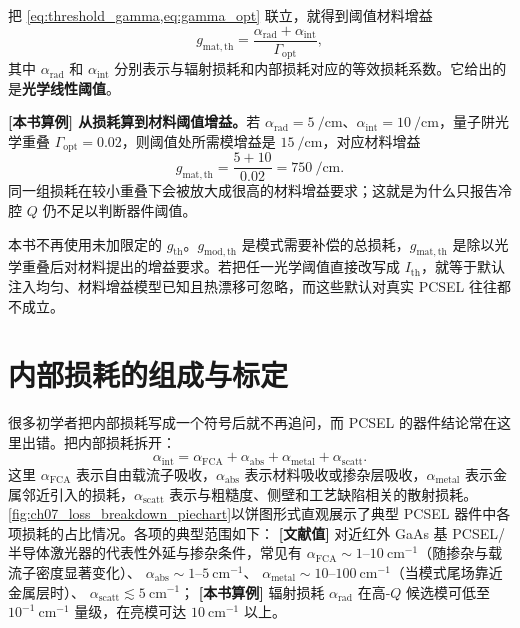 把 \cref{eq:threshold_gamma,eq:gamma_opt} 联立，就得到阈值材料增益
\begin{equation}
 g_{\mathrm{mat,th}} = \frac{\alpha_{\mathrm{rad}}+\alpha_{\mathrm{int}}}{\Gamma_{\mathrm{opt}}},
\label{eq:gth}
\end{equation}
其中 $\alpha_{\mathrm{rad}}$ 和 $\alpha_{\mathrm{int}}$ 分别表示与辐射损耗和内部损耗对应的等效损耗系数。它给出的是\textbf{光学线性阈值}。

\begin{ExampleBox}
\textbf{[本书算例] 从损耗算到材料阈值增益。}若 $\alpha_{\mathrm{rad}}=\SI{5}{\per\centi\meter}$、$\alpha_{\mathrm{int}}=\SI{10}{\per\centi\meter}$，量子阱光学重叠 $\Gamma_{\mathrm{opt}}=0.02$，则阈值处所需模增益是 $\SI{15}{\per\centi\meter}$，对应材料增益
\[
g_{\mathrm{mat,th}}=\frac{5+10}{0.02}=\SI{750}{\per\centi\meter}.
\]
同一组损耗在较小重叠下会被放大成很高的材料增益要求；这就是为什么只报告冷腔 $Q$ 仍不足以判断器件阈值。
\end{ExampleBox}

本书不再使用未加限定的 $g_{\mathrm{th}}$。$g_{\mathrm{mod,th}}$ 是模式需要补偿的总损耗，$g_{\mathrm{mat,th}}$ 是除以光学重叠后对材料提出的增益要求。若把任一光学阈值直接改写成 $I_{\mathrm{th}}$，就等于默认注入均匀、材料增益模型已知且热漂移可忽略，而这些默认对真实 PCSEL 往往都不成立。

\section{内部损耗的组成与标定}
很多初学者把内部损耗写成一个符号后就不再追问，而 PCSEL 的器件结论常在这里出错。把内部损耗拆开：
\begin{equation}
\alpha_{\mathrm{int}} = \alpha_{\mathrm{FCA}} + \alpha_{\mathrm{abs}} + \alpha_{\mathrm{metal}} + \alpha_{\mathrm{scatt}}.
\label{eq:alpha_int_detail}
\end{equation}
这里 $\alpha_{\mathrm{FCA}}$ 表示自由载流子吸收，$\alpha_{\mathrm{abs}}$ 表示材料吸收或掺杂层吸收，$\alpha_{\mathrm{metal}}$ 表示金属邻近引入的损耗，$\alpha_{\mathrm{scatt}}$ 表示与粗糙度、侧壁和工艺缺陷相关的散射损耗。\cref{fig:ch07_loss_breakdown_piechart}以饼图形式直观展示了典型 PCSEL 器件中各项损耗的占比情况。各项的典型范围如下：
\textbf{[文献值]} 对近红外 GaAs 基 PCSEL/半导体激光器的代表性外延与掺杂条件，常见有
$\alpha_{\mathrm{FCA}}\sim1$--$10\ \mathrm{cm}^{-1}$（随掺杂与载流子密度显著变化）、
$\alpha_{\mathrm{abs}}\sim1$--$5\ \mathrm{cm}^{-1}$、
$\alpha_{\mathrm{metal}}\sim10$--$100\ \mathrm{cm}^{-1}$（当模式尾场靠近金属层时）、
$\alpha_{\mathrm{scatt}}\lesssim5\ \mathrm{cm}^{-1}$\cite{coldren2012,zhoupan2023}；
\textbf{[本书算例]} 辐射损耗 $\alpha_{\mathrm{rad}}$ 在高-$Q$ 候选模可低至 $10^{-1}\ \mathrm{cm}^{-1}$ 量级，在亮模可达 $10\ \mathrm{cm}^{-1}$ 以上。


